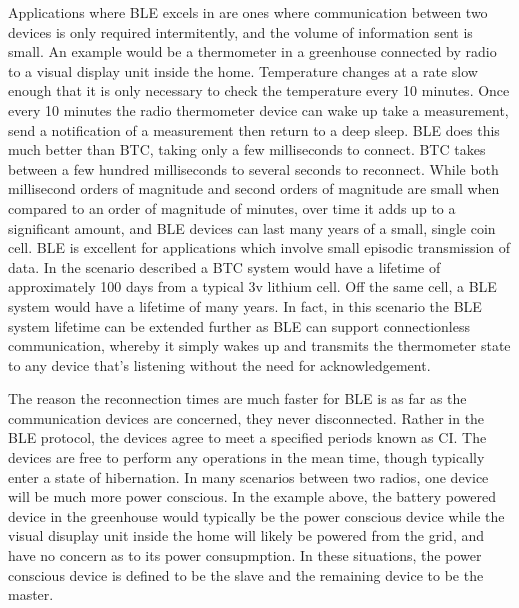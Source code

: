 \documentclass[]{article}
\begin{document}
Applications where \ac{BLE} excels in are ones where communication between two devices is only required intermitently, and the volume of information sent is small. An example would be a thermometer in a greenhouse connected by radio to a visual display unit inside the home. Temperature changes at a rate slow enough that it is only necessary to check the temperature every 10 minutes. Once every 10 minutes the radio thermometer device can wake up take a measurement, send a notification of a measurement then return to a deep sleep. \ac{BLE} does this much better than \ac{BTC}, taking only a few milliseconds to connect. \ac{BTC} takes between a few hundred milliseconds to several seconds to reconnect. While both millisecond orders of magnitude and second orders of magnitude are small when compared to an order of magnitude of minutes, over time it adds up to a significant amount, and \ac{BLE} devices can last many years of a small, single coin cell. \ac{BLE} is excellent for applications which involve small episodic transmission of data. In the scenario described a \ac{BTC} system would have a lifetime of approximately 100 days from a typical 3v lithium cell. Off the same cell, a \ac{BLE} system would have a lifetime of many years. In fact, in this scenario the \ac{BLE} system lifetime can be extended further as \ac{BLE} can support connectionless communication, whereby it simply wakes up and transmits the thermometer state to any device that's listening without the need for acknowledgement.

The reason the reconnection times are much faster for \ac{BLE} is as far as the communication devices are concerned, they never disconnected. Rather in the \ac{BLE} protocol, the devices agree to meet a specified periods known as \ac{CI}. The devices are free to perform any operations in the mean time, though typically enter a state of hibernation. In many scenarios between two radios, one device will be much more power conscious. In the example above, the battery powered device in the greenhouse would typically be the power conscious device while the visual disuplay unit inside the home will likely be powered from the grid, and have no concern as to its power consupmption. In these situations, the power conscious device is defined to be the slave and the remaining device to be the master. 
\end{document}
